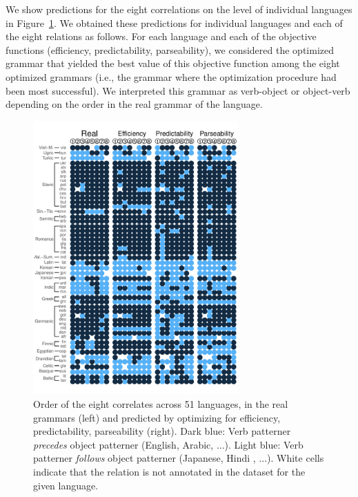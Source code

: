 \documentclass[10pt,twoside,lineno]{article}
\begin{document}
We show predictions for the eight correlations on the level of individual languages in Figure~\ref{fig:per-lang}.
We obtained these predictions for individual languages and each of the eight relations as follows.
For each language and each of the objective functions (efficiency, predictability, parseability), we considered the optimized grammar that yielded the best value of this objective function among the eight optimized grammars (i.e., the grammar where the optimization procedure had been most successful).
We interpreted this grammar as verb-object or object-verb depending on the order in the real grammar of the language.


\begin{figure} 
	\begin{center}
	\includegraphics[width=0.7\textwidth]{../results/correlations/figures/pred-eff-pred-pars-families-2.pdf} 
	\end{center}
	\caption{Order of the eight correlates across 51 languages, in the real grammars (left) and predicted by optimizing for efficiency, predictability, parseability (right). Dark blue: Verb patterner \emph{precedes} object patterner (English, Arabic, ...). Light blue: Verb patterner \emph{follows} object patterner (Japanese, Hindi , ...). White cells indicate that the relation is not annotated in the dataset for the given language.}\label{fig:per-lang}
\end{figure}
\end{document}
